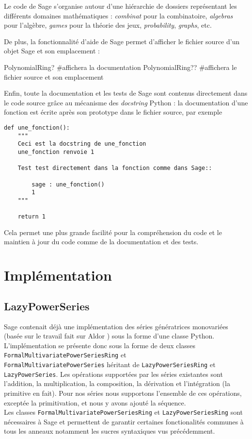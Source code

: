 \documentclass[12pt]{report}
\begin{document}
Le code de Sage s'organise autour d'une hiérarchie de dossiers représentant
les différents domaines mathématiques : \emph{combinat} pour la combinatoire,
\emph{algebras} pour l'algèbre, \emph{games} pour la théorie des jeux,
\emph{probability}, \emph{graphs}, etc.


De plus, la fonctionnalité d'aide de Sage permet d'afficher le fichier source
d'un objet Sage et son emplacement :
\begin{sageblock}
PolynomialRing?     #affichera la documentation
PolynomialRing??     #affichera le fichier source et son emplacement
\end{sageblock}
Enfin, toute la documentation et les tests de Sage sont contenus directement dans le code
source grâce au mécanisme des \emph{docstring} Python : la documentation d'une
fonction est écrite après son prototype dans le fichier source, par exemple

\noindent\begin{minipage}{\linewidth}
\begin{lstlisting}
def une_fonction():
    """
    Ceci est la docstring de une_fonction
    une_fonction renvoie 1
    
    Test test directement dans la fonction comme dans Sage::

        sage : une_fonction()
        1
    """

    return 1
\end{lstlisting}
\end{minipage}
Cela permet une plus grande facilité pour la compréhension du code et le
maintien à jour du code comme de la documentation et des tests.


\section{Implémentation}

\subsection{LazyPowerSeries}
Sage contenait déjà une implémentation des séries génératrices monovariées
(basée sur le travail fait sur Aldor
\cite{Hemmecke+Rubey:Aldor-Combinat:2006}) sous la forme d'une classe
Python. L'implémentation se présente donc sous la forme de deux classes
\verb|FormalMultivariatePowerSeriesRing| et\\ \verb|FormalMultivariatePowerSeries|
héritant de \verb|LazyPowerSeriesRing| et \verb|LazyPowerSeries|. Les
opérations supportées par les séries existantes sont l'addition, la multiplication, la
composition, la dérivation et l'intégration (la primitive en fait). Pour nos
séries nous supportons l'ensemble de ces opérations, exceptée la
primitivation, et nous y avons ajouté la séquence.\\
Les classes \verb|FormalMultivariatePowerSeriesRing| et
\verb|LazyPowerSeriesRing| sont nécessaires à Sage et permettent de garantir
certaines fonctionalités communes à tous les anneaux notamment les sucres
syntaxiques vus précédemment.
\end{document}
